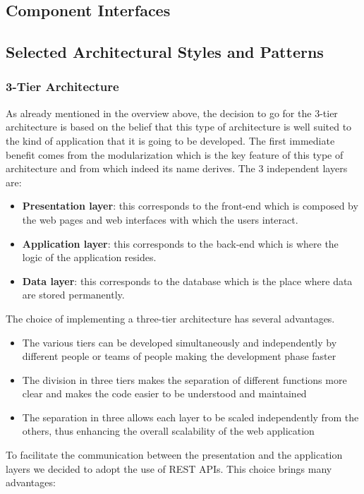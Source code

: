 \subsection{Component Interfaces}
\newpage
\subsection{Selected Architectural Styles and Patterns}
\subsubsection{3-Tier Architecture}
As already mentioned in the overview above, the decision to go for the 3-tier architecture is based on the belief that this type of architecture is well suited to the kind of application that it is going to be developed.
The first immediate benefit comes from the modularization which is the key feature of this type of architecture and from which indeed its name derives. The 3 independent layers are: 
\begin{itemize}
    \item \textbf{Presentation layer}: this corresponds to the front-end which is composed by the web pages and web interfaces with which the users interact.
    \item \textbf{Application layer}: this corresponds to the back-end which is where the logic of the application resides. 
    \item \textbf{Data layer}: this corresponds to the database which is the place where data are stored permanently.
\end{itemize}
The choice of implementing a three-tier architecture has several advantages.
\begin{itemize}
    \item The various tiers can be developed simultaneously and independently by different people or teams of people making the development phase faster
    \item The division in three tiers makes the separation of different functions more clear and makes the code easier to be understood and maintained
    \item The separation in three allows each layer to be scaled independently from the others, thus enhancing the overall scalability of the web application
\end{itemize}
To facilitate the communication between the presentation  and the application layers we decided to adopt the use of REST APIs. This choice brings many advantages:
